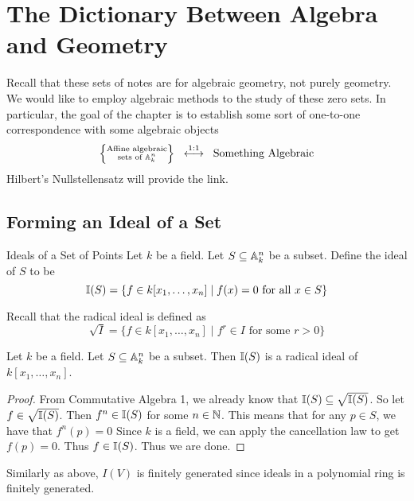 \documentclass[a4paper]{article}
\begin{document}
\pagebreak
\section{The Dictionary Between Algebra and Geometry}
Recall that these sets of notes are for algebraic geometry, not purely geometry. We would like to employ algebraic methods to the study of these zero sets. In particular, the goal of the chapter is to establish some sort of one-to-one correspondence with some algebraic objects $$\left\{\substack{\text{Affine algebraic}\\\text{sets of }\mathbb{A}_k^n}\right\}\;\;\overset{1:1}{\longleftrightarrow}\;\;\text{Something Algebraic}$$ Hilbert's Nullstellensatz will provide the link. 

\subsection{Forming an Ideal of a Set}
\begin{defn}{Ideals of a Set of Points}{} Let $k$ be a field. Let $S\subseteq\mathbb{A}_k^n$ be a subset. Define the ideal of $S$ to be $$\mathbb{I}(S)=\{f\in k[x_1,\dots,x_n]\;|\;f(x)=0\text{ for all }x\in S\}$$ 
\end{defn}

Recall that the radical ideal is defined as $$\sqrt{I}=\{f\in k[x_1,\dots,x_n]\;|\;f^r\in I\text{ for some }r>0\}$$

\begin{lmm}{}{} Let $k$ be a field. Let $S\subseteq\mathbb{A}_k^n$ be a subset. Then $\mathbb{I}(S)$ is a radical ideal of $k[x_1,\dots,x_n]$. \tcbline
\begin{proof}
From Commutative Algebra 1, we already know that $\mathbb{I}(S)\subseteq\sqrt{\mathbb{I}(S)}$. So let $f\in\sqrt{\mathbb{I}(S)}$. Then $f^n\in\mathbb{I}(S)$ for some $n\in\mathbb{N}$. This means that for any $p\in S$, we have that $f^n(p)=0$ Since $k$ is a field, we can apply the cancellation law to get $f(p)=0$. Thus $f\in\mathbb{I}(S)$. Thus we are done. 
\end{proof}
\end{lmm}

Similarly as above, $I(V)$ is finitely generated since ideals in a polynomial ring is finitely generated. 
\end{document}

